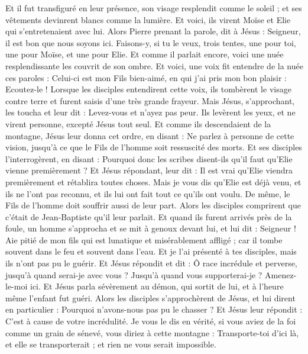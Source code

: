 \begin{multicols}{2}
Et il fut transfiguré en leur présence, son visage resplendit comme le soleil ; et ses vêtements devinrent blancs comme la lumière.
Et voici, ils virent Moïse et Elie qui s'entretenaient avec lui.
Alors Pierre prenant la parole, dit à Jésus : Seigneur, il est bon que nous soyons ici. Faisons-y, si tu le veux, trois tentes, une pour toi, une pour Moïse, et une pour Elie.
Et comme il parlait encore, voici une nuée resplendissante les couvrit de son ombre. Et voici, une voix fit entendre de la nuée ces paroles : Celui-ci est mon Fils bien-aimé, en qui j'ai pris mon bon plaisir : Ecoutez-le !
Lorsque les disciples entendirent cette voix, ils tombèrent le visage contre terre et furent saisis d'une très grande frayeur.
Mais Jésus, s'approchant, les toucha et leur dit : Levez-vous et n'ayez pas peur.
Ils levèrent les yeux, et ne virent personne, excepté Jésus tout seul.
Et comme ils descendaient de la montagne, Jésus leur donna cet ordre, en disant : Ne parlez à personne de cette vision, jusqu'à ce que le Fils de l'homme soit ressuscité des morts.
Et ses disciples l'interrogèrent, en disant : Pourquoi donc les scribes disent-ils qu'il faut qu'Elie vienne premièrement ?
Et Jésus répondant, leur dit : Il est vrai qu'Elie viendra premièrement et rétablira toutes choses.
Mais je vous dis qu'Elie est déjà venu, et ils ne l'ont pas reconnu, et ils lui ont fait tout ce qu'ils ont voulu. De même, le Fils de l'homme doit souffrir aussi de leur part.
Alors les disciples comprirent que c'était de Jean-Baptiste qu'il leur parlait.
Et quand ils furent arrivés près de la foule, un homme s'approcha et se mit à genoux devant lui,
et lui dit : Seigneur ! Aie pitié de mon fils qui est lunatique et misérablement affligé ; car il tombe souvent dans le feu et souvent dans l'eau.
Et je l'ai présenté à tes disciples, mais ils n'ont pas pu le guérir.
Et Jésus répondit et dit : Ô race incrédule et perverse, jusqu'à quand serai-je avec vous ? Jusqu'à quand vous supporterai-je ? Amenez-le-moi ici.
Et Jésus parla sévèrement au démon, qui sortit de lui, et à l'heure même l'enfant fut guéri.
Alors les disciples s'approchèrent de Jésus, et lui dirent en particulier : Pourquoi n'avons-nous pas pu le chasser ?
Et Jésus leur répondit : C'est à cause de votre incrédulité. Je vous le dis en vérité, si vous aviez de la foi comme un grain de sénevé, vous diriez à cette montagne : Transporte-toi d'ici là, et elle se transporterait ; et rien ne vous serait impossible.

\end{multicols}
